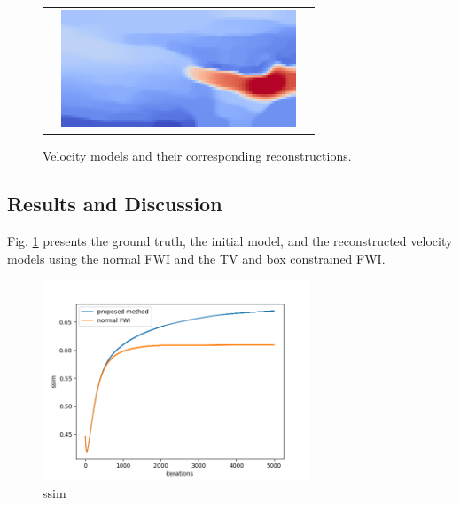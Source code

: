 \begin{figure}[htbp]
\begin{tabular}{m{68mm} m{70mm} m{10mm}}
\begin{minipage}[b]{70mm}
            \caption*{Initial model}
        \end{minipage} &
        \begin{minipage}[b]{70mm}
            \centering
            \includegraphics[width=70mm]{public/pds}
            \caption*{Reconstructed with the constrained FWI}
        \end{minipage} &
    \end{tabular}
    \caption{Velocity models and their corresponding reconstructions.}
    \label{fig:velocity-models}
\end{figure}



\subsection{Results and Discussion}\label{subsec:results-and-discussion}

Fig. \ref{fig:velocity-models} presents the ground truth, the initial model, and the reconstructed velocity models using the normal FWI and the TV and box constrained FWI.



\begin{figure}[htbp]\label{fig:ssim}
\vspace{-\baselineskip}
\begin{center}
    \includegraphics[width=80mm]{public/ssim}
    \caption{ssim}
\end{center}
\vspace{-\baselineskip}
\end{figure}








